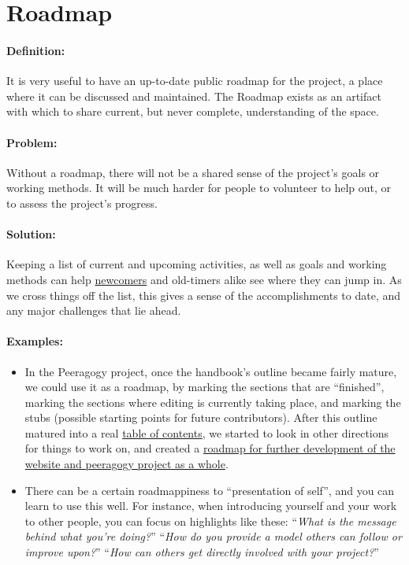 \section{Roadmap}

\paragraph{Definition:} It is very useful to have an up-to-date public
roadmap for the project, a place where it can be discussed and
maintained. The Roadmap exists as an artifact with which to share
current, but never complete, understanding of the space.

\paragraph{Problem:} Without a roadmap, there will not be a shared sense of
the project's goals or working methods. It will be much harder for
people to volunteer to help out, or to assess the project's progress.

\paragraph{Solution:} Keeping a list of current and upcoming activities, as
well as goals and working methods can
help \href{http://peeragogy.org/practice/heuristics/newcomer/}{newcomers}
and old-timers alike see where they can jump in. As we cross things off
the list, this gives a sense of the accomplishments to date, and any
major challenges that lie ahead.

\paragraph{Examples:}

\begin{itemize}
\item
  In the Peeragogy project, once the handbook's outline became fairly
  mature, we could use it as a roadmap, by marking the sections that are
  ``finished'', marking the sections where editing is currently taking
  place, and marking the stubs (possible starting points for future
  contributors). After this outline matured into a
  real \href{http://peeragogy.org/table-of-contents/}{table of contents},
  we started to look in other directions for things to work on, and
  created a \href{http://peeragogy.org/peeragogy-org-roadmap/}{roadmap
  for further development of the website and peeragogy project as a
  whole}.
\item
  There can be a certain roadmappiness to ``presentation of self'', and
  you can learn to use this well. For instance, when introducing
  yourself and your work to other people, you can focus on highlights
  like these: ``\emph{What is the message behind what you're doing?}''
    ``\emph{How do you provide a model others can follow or improve upon?}''
    ``\emph{How can others get directly involved with your project?}''
\end{itemize}

